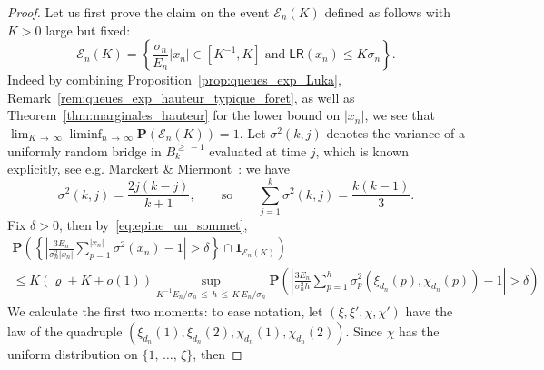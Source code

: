 \documentclass[AHL,Unicode,longabstracts,published]{cedram}
\newcommand{\ensembles}[1]{\mathbf{#1}}
\renewcommand{\P}{\ensembles{P}}
\renewcommand{\Pr}[1]{\P\left(#1\right)}
\newcommand{\1}{\ensembles{1}}
\renewcommand{\le}{\leqslant}
\renewcommand{\ge}{\geqslant}
\newcommand{\LR}{\mathsf{LR}}
\newcommand{\BBmap}{B}
\newcommand{\clE}{\mathcal{E}}
\newcommand{\edges}{E}
\begin{document}
\begin{proof}
Let us first prove the claim on the event $\clE_n(K)$ defined as follows with $K > 0$ large but fixed:
\begin{equation}\label{eq:bon_evenement_marginales_labels}
\clE_n(K) = \left\{\frac{\sigma_n}{\edges_n} |x_n| \in \left[K^{-1}, K\right]\; \text{and}\; \LR(x_n) \le K \sigma_n\right\}.
\end{equation}
Indeed by combining Proposition~\ref{prop:queues_exp_Luka}, Remark~\ref{rem:queues_exp_hauteur_typique_foret}, as well as Theorem~\ref{thm:marginales_hauteur} for the lower bound on $|x_n|$, we see that $\lim_{K\,\to\,\infty} \liminf_{n \,\to\,\infty} \Pr{\clE_n(K)} = 1$. Let $\sigma^2(k,j)$ denotes the variance of a uniformly random bridge in $\BBmap_k^{\ge\,-1}$ evaluated at time $j$, which is known explicitly, see e.g. Marckert \& Miermont~\cite[page 1664\footnote{Note that they consider uniform random bridges in $\BBmap_{k+1}^{\ge\,-1}$!}]{MM07}: we have
\[
\sigma^2(k,j) = \frac{2j(k-j)}{k+1},
\qquad\text{so}\qquad
\sum_{j=1}^k \sigma^2(k,j) = \frac{k(k-1)}{3}.
\]
Fix $\delta > 0$, then by~\eqref{eq:epine_un_sommet},
\begin{multline*}
\Pr{\left\{\left|\frac{3 \edges_n}{\sigma_n^2 |x_n|} \sum_{p = 1}^{|x_n|} \sigma^2(x_n) - 1\right| > \delta\right\} \cap \1_{\clE_n(K)}}
\\
\le K (\varrho + K + o(1)) \sup_{K^{-1} \edges_n / \sigma_n\,\le\,h\,\le\,K\,\edges_n / \sigma_n} \Pr{\left|\frac{3 \edges_n}{\sigma_n^2 h} \sum_{p = 1}^h \sigma^2_p\left(\xi_{d_n}(p), \chi_{d_n}(p)\right) - 1\right| > \delta}
\end{multline*}
We calculate the first two moments: to ease notation, let $(\xi, \xi', \chi, \chi')$ have the law of the quadruple $(\xi_{d_n}(1), \xi_{d_n}(2), \chi_{d_n}(1), \chi_{d_n}(2))$. Since $\chi$ has the uniform distribution on $\{1,\,\dots,\,\xi\}$, then


\end{proof}
\end{document}
